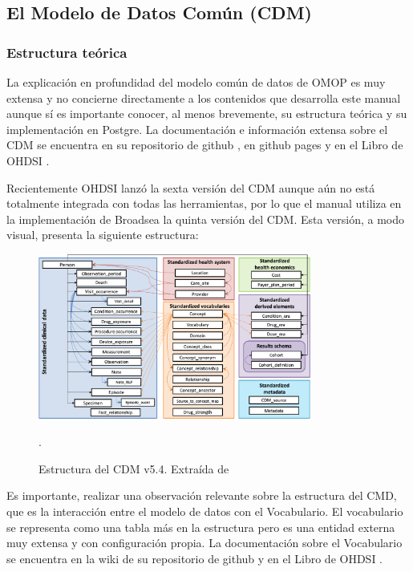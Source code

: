 \subsection{El Modelo de Datos Común (CDM)} \label{subsec:01cdm}

\subsubsection{Estructura teórica}

La explicación en profundidad del modelo común de datos de OMOP es muy extensa y no concierne directamente a los contenidos que desarrolla este manual aunque sí es importante conocer, al menos brevemente, su estructura teórica y su implementación en Postgre. La documentación e información extensa sobre el CDM se encuentra en su repositorio de github  \parencite{githubCDM}, en github pages \parencite{githubPagesCDM} y en el Libro de OHDSI \parencite{TheBookOfOHDSI}.

Recientemente OHDSI lanzó la sexta versión del CDM aunque aún no está totalmente integrada con todas las herramientas, por lo que el manual utiliza en la implementación de Broadsea la quinta versión del CDM. Esta versión, a modo visual, presenta la siguiente estructura:

\begin{figure}[H]
    \centering
    \includegraphics[width=0.80\textwidth]{figures/CDMEstructura.png}
     \caption{Estructura del CDM v5.4. Extraída de \parencite{githubPagesCDM}}.
    \label{fig:CDMEstructura}
\end{figure}

Es importante, realizar una observación relevante sobre la estructura del CMD, que es la interacción entre el modelo de datos con el Vocabulario. El vocabulario se representa como una tabla más en la estructura pero es una entidad externa muy extensa y con configuración propia. La documentación sobre el Vocabulario se encuentra en la wiki de su repositorio de github \parencite{githubVocabwiki} y en el Libro de OHDSI \parencite{TheBookOfOHDSI}.

